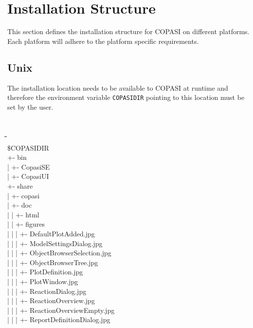 \documentclass[12pt]{book}
\begin{document}
\chapter{Installation Structure}
This section defines the installation structure for COPASI on
different platforms. Each platform will adhere to the platform
specific requirements. 

\section{Unix}
The installation location needs to be available to COPASI at runtime
and therefore the environment variable {\tt COPASIDIR} pointing to this
location must be set by the user. 
{\tt \scriptsize
\begin{tabbing}
 \hspace{4 pt}\=\hspace{17 pt}\=\hspace{17 pt}\=\hspace{17
 pt}\=\hspace{17 pt}\=\hspace{17 pt}\= \\ [-12 pt]
 \$COPASIDIR \\
 \> +- bin \\
 \> | \> +- CopasiSE \\
 \> | \> +- CopasiUI \\
 \> +- share \\
 \> | \> +- copasi \\
 \> | \> \> +- doc \\
 \> | \> \> | \> +- html \\
 \> | \> \> | \> \> +- figures \\
 \> | \> \> | \> \> | \> +- DefaultPlotAdded.jpg \\
 \> | \> \> | \> \> | \> +- ModelSettingsDialog.jpg \\
 \> | \> \> | \> \> | \> +- ObjectBrowserSelection.jpg \\
 \> | \> \> | \> \> | \> +- ObjectBrowserTree.jpg \\
 \> | \> \> | \> \> | \> +- PlotDefinition.jpg \\
 \> | \> \> | \> \> | \> +- PlotWindow.jpg \\
 \> | \> \> | \> \> | \> +- ReactionDialog.jpg \\
 \> | \> \> | \> \> | \> +- ReactionOverview.jpg \\
 \> | \> \> | \> \> | \> +- ReactionOverviewEmpty.jpg \\
 \> | \> \> | \> \> | \> +- ReportDefinitionDialog.jpg \\

\end{tabbing}}
\end{document}

